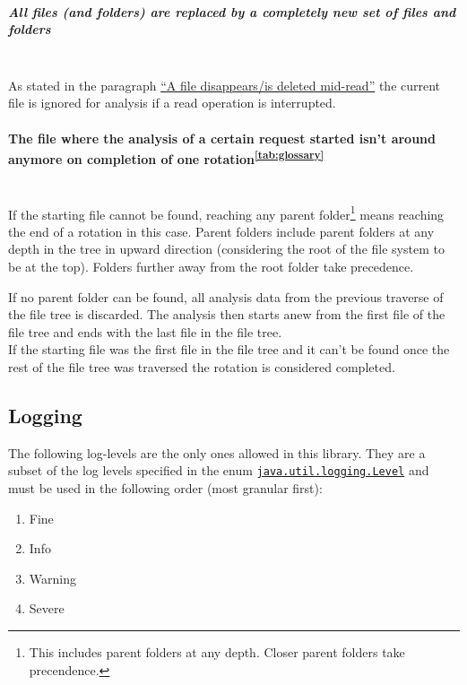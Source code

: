 \documentclass[11pt]{article} %
\begin{document}
    \subparagraph{All files (and folders) are replaced by a completely new set of files and folders} ~\\
    As stated in the paragraph \hyperref[par:file_disappear]{``A file disappears/is deleted mid-read''} the current file is ignored for analysis if a read operation is interrupted.


    \paragraph{The file where the analysis of a certain request started isn't around anymore on completion of one rotation\textsuperscript{\ref{tab:glossary}}} ~\\
    If the starting file cannot be found, reaching any parent folder\footnote{This includes parent folders at any depth. Closer parent folders take precendence.} means reaching the end of a rotation in this case. Parent folders include parent folders at any depth in the tree in upward direction (considering the root of the file system to be at the top). Folders further away from the root folder take precedence.

    If no parent folder can be found, all analysis data from the previous traverse of the file tree is discarded. The analysis then starts anew from the first file of the file tree and ends with the last file in the file tree.\\
    If the starting file was the first file in the file tree and it can't be found once the rest of the file tree was traversed the rotation is considered completed.


    \subsection{Logging}\label{sec:3.3}

    The following log-levels are the only ones allowed in this library. They are a subset of the log levels specified in the enum \href{https://docs.oracle.com/javase/8/docs/api/java/util/logging/class-use/Level.html}{\texttt{java.util.logging.Level}} and must be used in the following order (most granular first):

    \begin{enumerate}
        \item Fine
        \item Info
        \item Warning
        \item Severe
    \end{enumerate}
\end{document}
